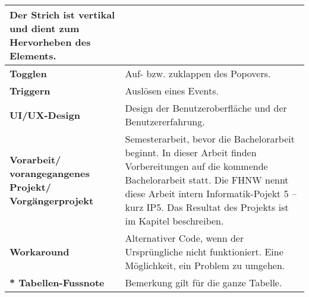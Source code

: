 \begin{table}[!ht]
\begin{adjustbox}{max width=\textwidth}
\begin{tabular}{ p{\glossarywithTitle} | p{\glossarywith} }
                Der Strich ist vertikal und dient zum Hervorheben des Elements. \\
            \hline
            \bf{Togglen} & Auf- bzw. zuklappen des Popovers. \\
            \hline
            \bf{Triggern} & Auslösen eines Events. \\
            \hline
            \bf{UI/UX-Design} & Design der Benutzeroberfläche und der Benutzererfahrung. \\
            \hline
            \raggedright \bf{Vorarbeit/ vorangegangenes Projekt/ Vorgängerprojekt} & 
                Semesterarbeit, bevor die Bachelorarbeit beginnt. 
                In dieser Arbeit finden Vorbereitungen auf die kommende Bachelorarbeit statt. 
                Die FHNW nennt diese Arbeit intern Informatik-Pojekt 5 – kurz IP5. 
                Das Resultat des Projekts ist im Kapitel \nameref{sec:countryChoice} beschreiben. \\
            \hline
            \bf{Workaround} & 
                Alternativer Code, wenn der Ursprüngliche nicht funktioniert. 
                Eine Möglichkeit, ein Problem zu umgehen. \\
            \hline
            \hline
            \raggedright \bf{* Tabellen-Fussnote} & Bemerkung gilt für die ganze Tabelle. \\
            \hline
        \end{tabular}
    \end{adjustbox}
\end{table}
